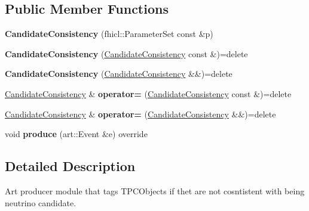 \subsection*{Public Member Functions}
\begin{DoxyCompactItemize}
\item 
\hypertarget{classCandidateConsistency_a8595b5e59ad6eccc745ef72eadacb298}{{\bfseries Candidate\-Consistency} (fhicl\-::\-Parameter\-Set const \&p)}\label{classCandidateConsistency_a8595b5e59ad6eccc745ef72eadacb298}

\item 
\hypertarget{classCandidateConsistency_ad7c4725ac70e9816207c26c147958be3}{{\bfseries Candidate\-Consistency} (\hyperlink{classCandidateConsistency}{Candidate\-Consistency} const \&)=delete}\label{classCandidateConsistency_ad7c4725ac70e9816207c26c147958be3}

\item 
\hypertarget{classCandidateConsistency_a5eaaca57d9db53aabfca9af527b354fb}{{\bfseries Candidate\-Consistency} (\hyperlink{classCandidateConsistency}{Candidate\-Consistency} \&\&)=delete}\label{classCandidateConsistency_a5eaaca57d9db53aabfca9af527b354fb}

\item 
\hypertarget{classCandidateConsistency_a00a0461760b399b46cecd5538b58bab1}{\hyperlink{classCandidateConsistency}{Candidate\-Consistency} \& {\bfseries operator=} (\hyperlink{classCandidateConsistency}{Candidate\-Consistency} const \&)=delete}\label{classCandidateConsistency_a00a0461760b399b46cecd5538b58bab1}

\item 
\hypertarget{classCandidateConsistency_aada6a266ad99b5c1341f47e91c44980b}{\hyperlink{classCandidateConsistency}{Candidate\-Consistency} \& {\bfseries operator=} (\hyperlink{classCandidateConsistency}{Candidate\-Consistency} \&\&)=delete}\label{classCandidateConsistency_aada6a266ad99b5c1341f47e91c44980b}

\item 
\hypertarget{classCandidateConsistency_a40c3b73d21d17afbe1a77e28e2adef92}{void {\bfseries produce} (art\-::\-Event \&e) override}\label{classCandidateConsistency_a40c3b73d21d17afbe1a77e28e2adef92}

\end{DoxyCompactItemize}


\subsection{Detailed Description}
Art producer module that tags T\-P\-C\-Objects if thet are not cosntistent with being neutrino candidate. 

